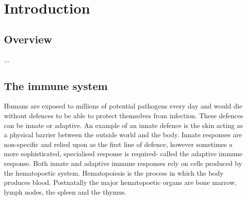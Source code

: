 \chapter{\label{ch:1-intro}Introduction} 


\section{Overview}
...

\section{The immune system}
Humans are exposed to millions of potential pathogens every day and would die without defences to be able to protect themselves from infection.
These defences can be innate or adaptive.
An example of an innate defence is the skin acting as a physical barrier between the outside world and the body.
Innate responses are non-specific and relied upon as the first line of defence, however sometimes a more sophisticated, specialised response is required- called the adaptive immune response.
Both innate and adaptive immune responses rely on cells produced by the hematopoetic system.
Hematopoiesis is the process in which the body produces blood.
Postnatally the major hematopoetic organs are bone marrow, lymph nodes, the spleen and the thymus.

